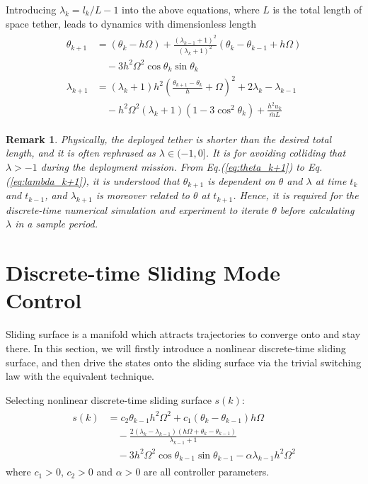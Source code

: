 \documentclass[10pt,final,journal]{IEEEtran}
\newtheorem{myrem}{Remark}
\begin{document}
	Introducing $\lambda_k=l_k/L-1$ into the above equations, where $L$ is the total length of space tether, leads to dynamics with dimensionless length 
	\begin{align}\begin{split}\label{eq:lambda_k+1}
		\theta_{k+1}&=\left(\theta_{k}-h\Omega\right)+\frac{(\lambda_{k-1}+1)^2}{(\lambda_k+1)^2}\left(\theta_{k}-\theta_{k-1}+h\Omega\right)\\
		&\quad-3h^2\Omega^2\cos\theta_{k}\sin\theta_{k}\\
		\lambda_{k+1}&=(\lambda_k+1)h^2\left(\frac{\theta_{k+1}-\theta_{k}}{h}+\Omega\right)^2+2\lambda_k-\lambda_{k-1}\\
		&\quad-h^2\Omega^2(\lambda_k+1)(1-3\cos^2\theta_{k})+\frac{h^2u_k}{\bar{m}L}
	\end{split}\end{align}
	\begin{myrem}\label{remark:1}
		Physically, the deployed tether is shorter than the desired total length, and it is often rephrased as $\lambda\in(-1,0]$. It is for avoiding colliding that $\lambda>-1$ during the deployment mission. From Eq.(\ref{eq:theta_k+1}) to Eq.(\ref{eq:lambda_k+1}), it is understood that $\theta_{k+1}$ is dependent on $\theta$ and $\lambda$ at time $t_k$ and $t_{k-1}$, and $\lambda_{k+1}$ is moreover related to $\theta$ at $t_{k+1}$. Hence, it is required for the discrete-time numerical simulation and experiment to iterate $\theta$ before calculating $\lambda$ in a sample period.
        \end{myrem}
        \section{Discrete-time Sliding Mode Control}\label{sec:Discrete-time Sliding Mode Control} 
	Sliding surface is a manifold which attracts trajectories to converge onto and stay there. In this section, we will firstly introduce a nonlinear discrete-time sliding surface, and then drive the states onto the sliding surface via the trivial switching law with the equivalent technique.

	Selecting nonlinear discrete-time sliding surface $s(k)$:
	\begin{align}\begin{split}\label{eq:discrete time sliding furface}
				s(k) &= c_2\theta_{k-1}h^2\Omega^2+c_1(\theta_k-\theta_{k-1})h\Omega\\
				&\quad-\frac{2(\lambda_k-\lambda_{k-1})(h\Omega+\theta_k-\theta_{k-1})}{\lambda_{k-1}+1}\\
		&\quad-3h^2\Omega^2\cos\theta_{k-1}\sin\theta_{k-1}-\alpha\lambda_{k-1}h^2\Omega^2
	\end{split}\end{align}
	where $c_1>0$, $c_2>0$ and $\alpha>0$ are all controller parameters.
\end{document}
